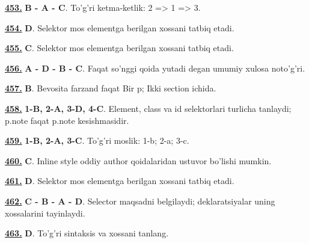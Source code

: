\documentclass[10pt,a4paper,oneside]{article}
\begin{document}
\noindent\hyperlink{q453}{\textbf{453.}} \textbf{B - A - C}.  To'g'ri ketma-ketlik: 2 =\textgreater{} 1 =\textgreater{} 3.
\par\vspace{3mm}
\noindent\hyperlink{q454}{\textbf{454.}} \textbf{D}.  Selektor mos elementga berilgan xossani tatbiq etadi.
\par\vspace{3mm}
\noindent\hyperlink{q455}{\textbf{455.}} \textbf{C}.  Selektor mos elementga berilgan xossani tatbiq etadi.
\par\vspace{3mm}
\noindent\hyperlink{q456}{\textbf{456.}} \textbf{A - D - B - C}.  Faqat so'nggi qoida yutadi degan umumiy xulosa noto'g'ri.
\par\vspace{3mm}
\noindent\hyperlink{q457}{\textbf{457.}} \textbf{B}.  Bevosita farzand faqat Bir p; Ikki section ichida.
\par\vspace{3mm}
\noindent\hyperlink{q458}{\textbf{458.}} \textbf{1-B, 2-A, 3-D, 4-C}.  Element, class va id selektorlari turlicha tanlaydi; p.note faqat p.note kesishmasidir.
\par\vspace{3mm}
\noindent\hyperlink{q459}{\textbf{459.}} \textbf{1-B, 2-A, 3-C}.  To'g'ri moslik: 1-b; 2-a; 3-c.
\par\vspace{3mm}
\noindent\hyperlink{q460}{\textbf{460.}} \textbf{C}.  Inline style oddiy author qoidalaridan ustuvor bo'lishi mumkin.
\par\vspace{3mm}
\noindent\hyperlink{q461}{\textbf{461.}} \textbf{D}.  Selektor mos elementga berilgan xossani tatbiq etadi.
\par\vspace{3mm}
\noindent\hyperlink{q462}{\textbf{462.}} \textbf{C - B - A - D}.  Selector maqsadni belgilaydi; deklaratsiyalar uning xossalarini tayinlaydi.
\par\vspace{3mm}
\noindent\hyperlink{q463}{\textbf{463.}} \textbf{D}.  To'g'ri sintaksis va xossani tanlang.
\par\vspace{3mm}
\end{document}
